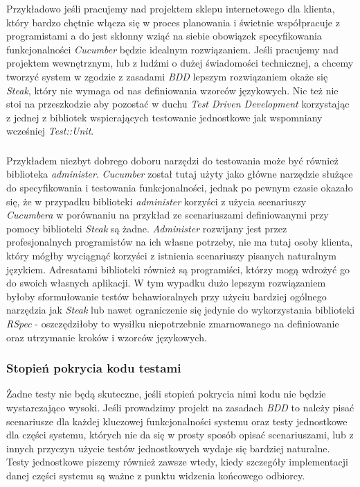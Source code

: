  Przykładowo jeśli pracujemy nad projektem sklepu internetowego dla klienta, który bardzo chętnie włącza się w proces planowania i świetnie współpracuje z programistami a do jest skłonny wziąć na siebie obowiązek specyfikowania funkcjonalności \emph{Cucumber} będzie idealnym rozwiązaniem. Jeśli pracujemy nad projektem wewnętrznym, lub z ludźmi o dużej świadomości technicznej, a chcemy tworzyć system w zgodzie z zasadami \emph{BDD} lepszym rozwiązaniem okaże się \emph{Steak}, który nie wymaga od nas definiowania wzorców językowych. Nic też nie stoi na przeszkodzie aby pozostać w duchu \emph{Test Driven Development} korzystając z jednej z bibliotek wspierających testowanie jednostkowe jak wspomniany wcześniej \emph{Test::Unit}.
  
  \subsubsection{}
  Przykładem niezbyt dobrego doboru narzędzi do testowania może być również biblioteka \emph{administer}. \emph{Cucumber} został tutaj użyty jako główne narzędzie służące do specyfikowania i testowania funkcjonalności, jednak po pewnym czasie okazało się, że w przypadku biblioteki \emph{administer} korzyści z użycia scenariuszy \emph{Cucumbera} w porównaniu na przykład ze scenariuszami definiowanymi przy pomocy biblioteki \emph{Steak} są żadne. \emph{Administer} rozwijany jest przez profesjonalnych programistów na ich własne potrzeby, nie ma tutaj osoby klienta, który mógłby wyciągnąć korzyści z istnienia scenariuszy pisanych naturalnym językiem. Adresatami biblioteki również są programiści, którzy mogą wdrożyć go do swoich własnych aplikacji. W tym wypadku dużo lepszym rozwiązaniem byłoby sformułowanie testów behawioralnych przy użyciu bardziej ogólnego narzędzia jak \emph{Steak} lub nawet ograniczenie się jedynie do wykorzystania biblioteki \emph{RSpec} - oszczędziłoby to wysiłku niepotrzebnie zmarnowanego na definiowanie oraz utrzymanie kroków i wzorców językowych.
  
  \subsubsection{Stopień pokrycia kodu testami}
  Żadne testy nie będą skuteczne, jeśli stopień pokrycia nimi kodu nie będzie wystarczająco wysoki. Jeśli prowadzimy projekt na zasadach \emph{BDD} to należy pisać scenariusze dla każdej kluczowej funkcjonalności systemu oraz testy jednostkowe dla części systemu, których nie da się w prosty sposób opisać scenariuszami, lub z innych przyczyn użycie testów jednostkowych wydaje się bardziej naturalne. Testy jednostkowe piszemy również zawsze wtedy, kiedy szczegóły implementacji danej części systemu są ważne z punktu widzenia końcowego odbiorcy.
  
